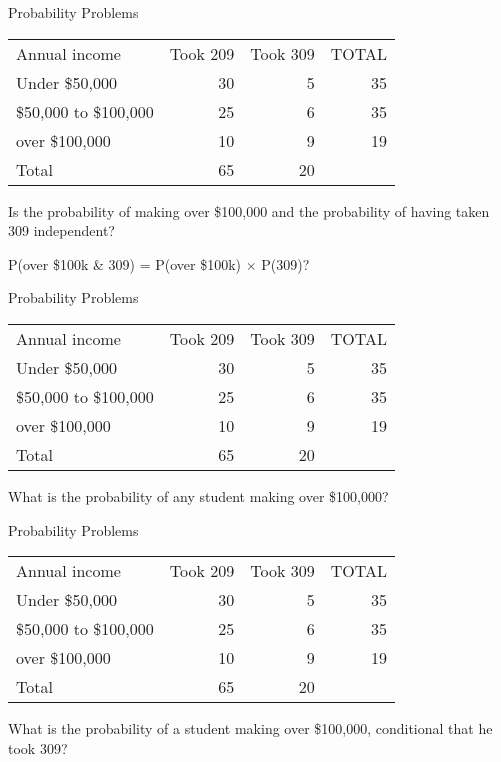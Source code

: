 \documentclass[presentation]{beamer}
\begin{document}
\begin{frame}[label={sec:orge50bd67}]{Probability Problems}
\begin{center}
\begin{tabular}{lrrr}
Annual income & Took 209 & Took 309 & TOTAL\\
Under \$50,000 & 30 & 5 & 35\\
\$50,000 to \$100,000 & 25 & 6 & 35\\
over \$100,000 & 10 & 9 & 19\\
Total & 65 & 20 & \\
\end{tabular}
\end{center}

Is the probability of making over \$100,000 and the probability of having taken 309 independent?

P(over \$100k \& 309) = P(over \$100k) \(\times\) P(309)?
\end{frame}



\begin{frame}[label={sec:orgfcccfc8}]{Probability Problems}
\begin{center}
\begin{tabular}{lrrr}
Annual income & Took 209 & Took 309 & TOTAL\\
Under \$50,000 & 30 & 5 & 35\\
\$50,000 to \$100,000 & 25 & 6 & 35\\
over \$100,000 & 10 & 9 & 19\\
Total & 65 & 20 & \\
\end{tabular}
\end{center}

What is the probability of any student making over \$100,000?
\end{frame}



\begin{frame}[label={sec:orgfda3b11}]{Probability Problems}
\begin{center}
\begin{tabular}{lrrr}
Annual income & Took 209 & Took 309 & TOTAL\\
Under \$50,000 & 30 & 5 & 35\\
\$50,000 to \$100,000 & 25 & 6 & 35\\
over \$100,000 & 10 & 9 & 19\\
Total & 65 & 20 & \\
\end{tabular}
\end{center}

What is the probability of a student making over \$100,000, conditional that he took 309?
\end{frame}
\end{document}

